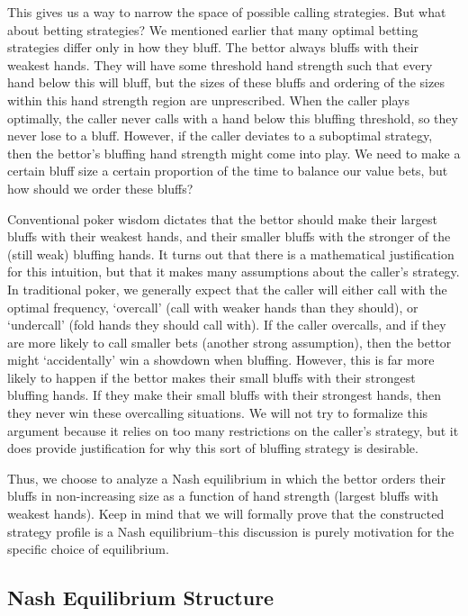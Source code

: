 \documentclass[../../main/main.tex]{subfiles}
\begin{document}
This gives us a way to narrow the space of possible calling strategies. But what about betting strategies? We mentioned earlier that many optimal betting strategies differ only in how they bluff. The bettor always bluffs with their weakest hands. They will have some threshold hand strength such that every hand below this will bluff, but the sizes of these bluffs and ordering of the sizes within this hand strength region are unprescribed. When the caller plays optimally, the caller never calls with a hand below this bluffing threshold, so they never lose to a bluff. However, if the caller deviates to a suboptimal strategy, then the bettor's bluffing hand strength might come into play. We need to make a certain bluff size a certain proportion of the time to balance our value bets, but how should we order these bluffs?

Conventional poker wisdom dictates that the bettor should make their largest bluffs with their weakest hands, and their smaller bluffs with the stronger of the (still weak) bluffing hands\cite{chen2006mathematics}. It turns out that there is a mathematical justification for this intuition, but that it makes many assumptions about the caller's strategy. In traditional poker, we generally expect that the caller will either call with the optimal frequency, `overcall' (call with weaker hands than they should), or `undercall' (fold hands they should call with). If the caller overcalls, and if they are more likely to call smaller bets (another strong assumption), then the bettor might `accidentally' win a showdown when bluffing. However, this is far more likely to happen if the bettor makes their small bluffs with their strongest bluffing hands. If they make their small bluffs with their strongest hands, then they never win these overcalling situations. We will not try to formalize this argument because it relies on too many restrictions on the caller's strategy, but it does provide justification for why this sort of bluffing strategy is desirable. 

Thus, we choose to analyze a Nash equilibrium in which the bettor orders their bluffs in non-increasing size as a function of hand strength (largest bluffs with weakest hands). Keep in mind that we will formally prove that the constructed strategy profile is a Nash equilibrium--this discussion is purely motivation for the specific choice of equilibrium.

\subsection{Nash Equilibrium Structure}
\label{subsec:nash_equilibrium_structure}
\end{document}

